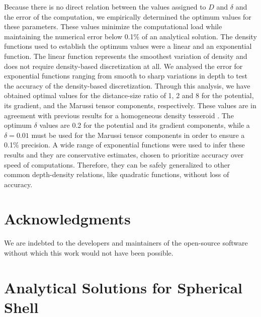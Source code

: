 \documentclass[extra, referee]{gji}
\begin{document}
Because there is no direct relation between the values assigned to $D$ and $\delta$ and
the error of the computation, we empirically determined the optimum values for these
parameters.
These values minimize the computational load while maintaining the numerical error below
0.1\% of an analytical solution.
The density functions used to establish the optimum values were a linear and an
exponential function.
The linear function represents the smoothest variation of density and does not require
density-based discretization at all.
We analysed the error for exponential functions ranging from smooth to sharp variations
in depth to test the accuracy of the density-based discretization.
Through this analysis, we have obtained optimal values for the distance-size ratio of
1, 2 and 8 for the potential, its gradient, and the Marussi tensor components,
respectively.
These values are in agreement with previous results for a homogeneous density tesseroid
\citep{Uieda2016}.
The optimum $\delta$ values are 0.2 for the potential and its gradient components, while
a $\delta = 0.01$ must be used for the Marussi tensor components in order to ensure a
0.1\% precision.
A wide range of exponential functions were used to infer these results and they are
conservative estimates, chosen to prioritize accuracy over speed of computations.
Therefore, they can be safely generalized to other common depth-density relations, like
quadratic functions, without loss of accuracy.




\section{Acknowledgments}

We are indebted to the developers and maintainers of the open-source software without
which this work would not have been possible.





\appendix

\section{Analytical Solutions for Spherical Shell}
\label{sec:shell}
\end{document}
